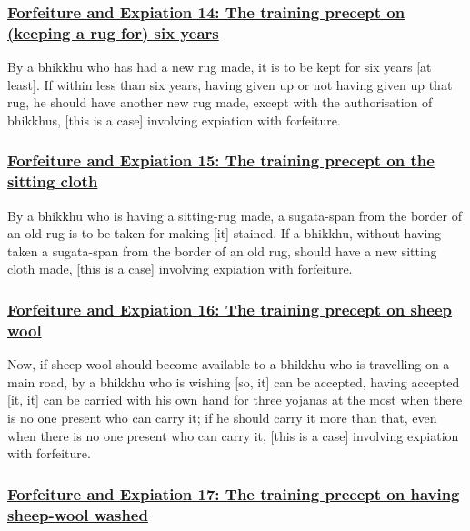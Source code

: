 \subsubsection*{\hyperref[np14]{Forfeiture and Expiation 14: The training precept on (keeping a rug for) six years}}
\label{forf-exp14}

By a bhikkhu who has had a new rug made, it is to be kept for six years [at least]. If within less than six years, having given up or not having given up that rug, he should have another new rug made, except with the authorisation of bhikkhus, [this is a case] involving expiation with forfeiture.



\subsubsection*{\hyperref[np15]{Forfeiture and Expiation 15: The training precept on the sitting cloth}}
\label{forf-exp15}

By a bhikkhu who is having a sitting-rug made, a sugata-span from the border of an old rug is to be taken for making [it] stained. If a bhikkhu, without having taken a sugata-span from the border of an old rug, should have a new sitting cloth made, [this is a case] involving expiation with forfeiture.



\subsubsection*{\hyperref[np16]{Forfeiture and Expiation 16: The training precept on sheep wool}}
\label{forf-exp16}

Now, if sheep-wool should become available to a bhikkhu who is travelling on a main road, by a bhikkhu who is wishing [so, it] can be accepted, having accepted [it, it] can be carried with his own hand for three yojanas at the most when there is no one present who can carry it; if he should carry it more than that, even when there is no one present who can carry it, [this is a case] involving expiation with forfeiture.



\subsubsection*{\hyperref[np17]{Forfeiture and Expiation 17: The training precept on having sheep-wool washed}}
\label{forf-exp17}

